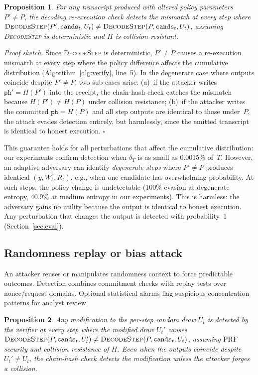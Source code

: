 \documentclass[conference]{IEEEtran}
\newtheorem{proposition}{Proposition}
\newcommand{\proc}[1]{\textnormal{\textsc{#1}}}
\begin{document}
\begin{proposition}\label{prop:policy}
For any transcript produced with altered policy parameters $P'\!\neq\!P$, the decoding re-execution check detects the mismatch at every step where $\proc{DecodeStep}(P', \texttt{cands}_t, U_t) \neq \proc{DecodeStep}(P, \texttt{cands}_t, U_t)$, assuming \proc{DecodeStep} is deterministic and $H$ is collision-resistant.
\end{proposition}

\textit{Proof sketch.}
Since \proc{DecodeStep} is deterministic, $P'\!\neq\!P$ causes a re-execution mismatch at every step where the policy difference affects the cumulative distribution (Algorithm~\ref{alg:verify}, line~5). In the degenerate case where outputs coincide despite $P'\!\neq\!P$, two sub-cases arise: (a)~if the attacker writes $\texttt{ph}'=H(P')$ into the receipt, the chain-hash check catches the mismatch because $H(P')\!\neq\!H(P)$ under collision resistance; (b)~if the attacker writes the committed $\texttt{ph}=H(P)$ and all step outputs are identical to those under~$P$, the attack evades detection entirely, but harmlessly, since the emitted transcript is identical to honest execution.
\hfill$\square$

This guarantee holds for all perturbations that affect the cumulative distribution: our experiments confirm detection when $\delta_T$ is as small as 0.0015\% of~$T$. However, an adaptive adversary can identify \emph{degenerate steps} where $P' \neq P$ produces identical $(y, W^s_t, R_t)$, e.g., when one candidate has overwhelming probability. At such steps, the policy change is undetectable (100\% evasion at degenerate entropy, 40.9\% at medium entropy in our experiments). This is harmless: the adversary gains no utility because the output is identical to honest execution. Any perturbation that changes the output is detected with probability~1 (Section~\ref{sec:eval}).

\subsection{Randomness replay or bias attack}
An attacker reuses or manipulates randomness context to force predictable outcomes. Detection combines commitment checks with replay tests over nonce/request domains. Optional statistical alarms flag suspicious concentration patterns for analyst review.

\begin{proposition}\label{prop:rand}
Any modification to the per-step random draw $U_t$ is detected by the verifier at every step where the modified draw $U_t'$ causes $\proc{DecodeStep}(P, \texttt{cands}_t, U_t') \neq \proc{DecodeStep}(P, \texttt{cands}_t, U_t)$, assuming $\mathrm{PRF}$ security and collision resistance of $H$. Even when the outputs coincide despite $U_t' \neq U_t$, the chain-hash check detects the modification unless the attacker forges a collision.
\end{proposition}
\end{document}
